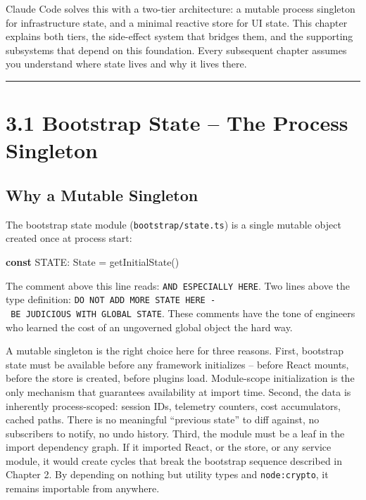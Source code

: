 \documentclass[
  english,
  11pt,
  letterpaper,
]{book}
\newenvironment{Shaded}{\begin{snugshade}}{\end{snugshade}}
\newcommand{\FunctionTok}[1]{\textcolor[rgb]{0.28,0.35,0.67}{#1}}
\newcommand{\KeywordTok}[1]{\textcolor[rgb]{0.00,0.23,0.31}{\textbf{#1}}}
\newcommand{\NormalTok}[1]{\textcolor[rgb]{0.00,0.23,0.31}{#1}}
\newcommand{\OperatorTok}[1]{\textcolor[rgb]{0.37,0.37,0.37}{#1}}
\begin{document}
Claude Code solves this with a two-tier architecture: a mutable process
singleton for infrastructure state, and a minimal reactive store for UI
state. This chapter explains both tiers, the side-effect system that
bridges them, and the supporting subsystems that depend on this
foundation. Every subsequent chapter assumes you understand where state
lives and why it lives there.

\begin{center}\rule{0.5\linewidth}{0.5pt}\end{center}

\section{3.1 Bootstrap State -- The Process
Singleton}\label{bootstrap-state-the-process-singleton}

\subsection{Why a Mutable Singleton}\label{why-a-mutable-singleton}

The bootstrap state module (\texttt{bootstrap/state.ts}) is a single
mutable object created once at process start:

\begin{Shaded}
\begin{Highlighting}[]
\KeywordTok{const}\NormalTok{ STATE}\OperatorTok{:}\NormalTok{ State }\OperatorTok{=} \FunctionTok{getInitialState}\NormalTok{()}
\end{Highlighting}
\end{Shaded}

The comment above this line reads: \texttt{AND\ ESPECIALLY\ HERE}. Two
lines above the type definition:
\texttt{DO\ NOT\ ADD\ MORE\ STATE\ HERE\ -\ BE\ JUDICIOUS\ WITH\ GLOBAL\ STATE}.
These comments have the tone of engineers who learned the cost of an
ungoverned global object the hard way.

A mutable singleton is the right choice here for three reasons. First,
bootstrap state must be available before any framework initializes --
before React mounts, before the store is created, before plugins load.
Module-scope initialization is the only mechanism that guarantees
availability at import time. Second, the data is inherently
process-scoped: session IDs, telemetry counters, cost accumulators,
cached paths. There is no meaningful ``previous state'' to diff against,
no subscribers to notify, no undo history. Third, the module must be a
leaf in the import dependency graph. If it imported React, or the store,
or any service module, it would create cycles that break the bootstrap
sequence described in Chapter 2. By depending on nothing but utility
types and \texttt{node:crypto}, it remains importable from anywhere.
\end{document}
